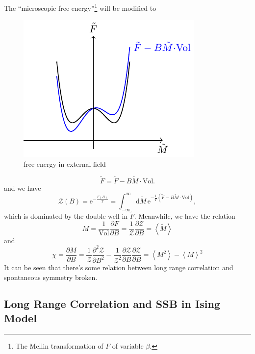 
The ``microscopic free energy''\footnote{The Mellin transformation of $F$ of variable $\beta$.} will be modified to
\begin{figure}[h]
    \centering
    \includegraphics{figures/free_energy_in_external_field.pdf}
    \caption{free energy in external field}
\end{figure}
\begin{equation}
  \tilde{F} = \tilde{F} - B \tilde{M} \cdot \text{Vol}.
\end{equation}
and we have 
\begin{equation}
    \mathcal{Z}\left( B \right)  = \mathrm{e}^{- \frac{F\left( B \right)}{T}} = \int_{-\infty}^{\infty} \mathrm{d}\tilde{M} \, \mathrm{e}^{-\frac{1}{T} \left( \tilde{F} - B \tilde{M} \cdot \text{Vol} \right) } ,
\end{equation}
which is dominated by the double well in $\tilde{F}$.
Meanwhile, we have the relation
\begin{equation}
    M = \frac{1}{\text{Vol}} \frac{\partial F}{\partial B} = \frac{1}{\mathcal{Z}} \frac{\partial \mathcal{Z}}{\partial B} = \left< \tilde{M} \right> 
\end{equation}
and
\begin{equation}
  \chi = \frac{\partial M}{\partial B} = \frac{1}{\mathcal{Z}} \frac{\partial^2 \mathcal{Z}}{\partial B^2} - \frac{1}{\mathcal{Z}^{2}} \frac{\partial \mathcal{Z}}{\partial B} \frac{\partial \mathcal{Z}}{\partial B} = \left< M^{2} \right> - \left< M \right>^{2}
\end{equation}
It can be seen that there's some relation between long range correlation and spontaneous symmetry broken.

\subsection{Long Range Correlation and SSB in Ising Model}

